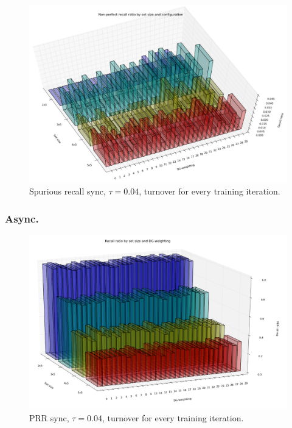 \begin{figure}
    \centering
    \includegraphics[width=13cm]{fig/DGWs/cut/non_perfect_recall_by_dgw_sync_tm1_04_cut}
    \caption{Spurious recall sync, $\tau=0.04$, turnover for every training iteration.}
    \label{fig:non_perfect_recall_by_dgw_sync_tm1_04}
\end{figure}


\subsubsection{Async.}

\begin{figure}
    \centering
    \includegraphics[width=13cm]{fig/DGWs/cut/avg_recall_ratio_by_dgw_async_tm1_04_cut}
    \caption{PRR sync, $\tau=0.04$, turnover for every training iteration.}
    \label{fig:avg_recall_ratio_by_dgw_async_tm1_04}
\end{figure}

